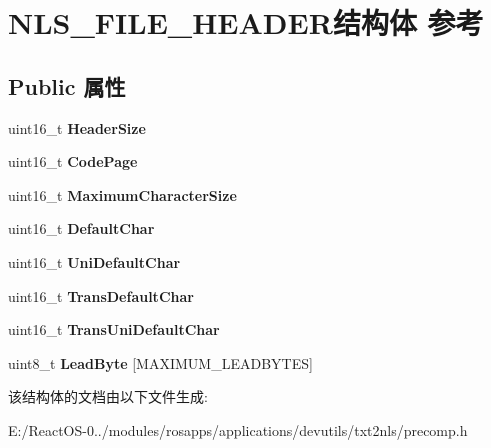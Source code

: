 \hypertarget{struct_n_l_s___f_i_l_e___h_e_a_d_e_r}{}\section{N\+L\+S\+\_\+\+F\+I\+L\+E\+\_\+\+H\+E\+A\+D\+E\+R结构体 参考}
\label{struct_n_l_s___f_i_l_e___h_e_a_d_e_r}
\subsection*{Public 属性}
\begin{DoxyCompactItemize}
\item 
\mbox{\label{struct_n_l_s___f_i_l_e___h_e_a_d_e_r_ad83df2d60970c90ec39f5c8a251aa77e}} 
uint16\+\_\+t {\bfseries Header\+Size}
\item 
\mbox{\label{struct_n_l_s___f_i_l_e___h_e_a_d_e_r_ab3acb5523f50441ff99b77ae42587080}} 
uint16\+\_\+t {\bfseries Code\+Page}
\item 
\mbox{\label{struct_n_l_s___f_i_l_e___h_e_a_d_e_r_a30f4829c4ff44bdd69ad642cb6a464a8}} 
uint16\+\_\+t {\bfseries Maximum\+Character\+Size}
\item 
\mbox{\label{struct_n_l_s___f_i_l_e___h_e_a_d_e_r_abcc53901f94a1c4b366b05e841af97e3}} 
uint16\+\_\+t {\bfseries Default\+Char}
\item 
\mbox{\label{struct_n_l_s___f_i_l_e___h_e_a_d_e_r_a42d1ab8bf169a7ed626013aa96b018cd}} 
uint16\+\_\+t {\bfseries Uni\+Default\+Char}
\item 
\mbox{\label{struct_n_l_s___f_i_l_e___h_e_a_d_e_r_a25038009c341bfda2c9caa9fe6a22117}} 
uint16\+\_\+t {\bfseries Trans\+Default\+Char}
\item 
\mbox{\label{struct_n_l_s___f_i_l_e___h_e_a_d_e_r_a1850721a767ad848ddb142db6f1dc6e9}} 
uint16\+\_\+t {\bfseries Trans\+Uni\+Default\+Char}
\item 
\mbox{\label{struct_n_l_s___f_i_l_e___h_e_a_d_e_r_abaa5b36e4ba70c91158b98ce5bdb8705}} 
uint8\+\_\+t {\bfseries Lead\+Byte} \mbox{[}M\+A\+X\+I\+M\+U\+M\+\_\+\+L\+E\+A\+D\+B\+Y\+T\+ES\mbox{]}
\end{DoxyCompactItemize}


该结构体的文档由以下文件生成\+:\begin{DoxyCompactItemize}
\item 
E\+:/\+React\+O\+S-\/0../modules/rosapps/applications/devutils/txt2nls/precomp.\+h\end{DoxyCompactItemize}
